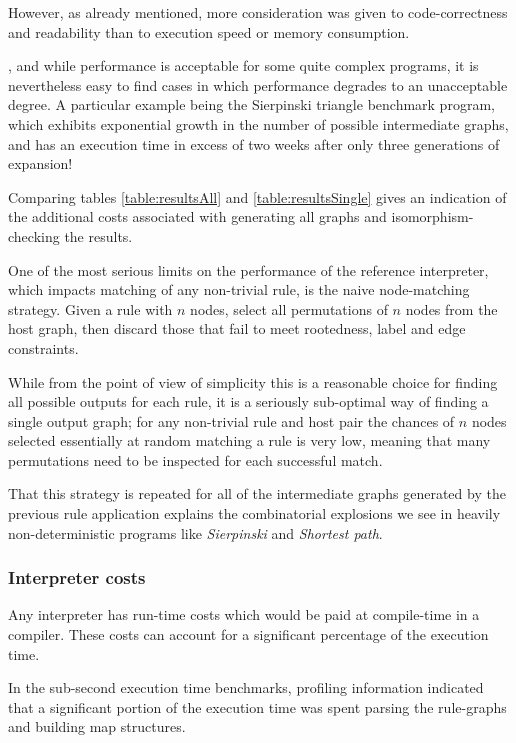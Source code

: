 However, as already mentioned, more consideration was given to code-correctness and readability than to execution speed or memory consumption.

, and while performance is acceptable for some quite complex programs, it is nevertheless easy to find cases in which performance degrades to an unacceptable degree. A particular example being the Sierpinski triangle benchmark program, which exhibits exponential growth in the number of possible intermediate graphs, and has an execution time in excess of two weeks after only three generations of expansion!

Comparing tables \ref{table:resultsAll} and \ref{table:resultsSingle} gives an indication of the additional costs associated with generating all graphs and isomorphism-checking the results.

One of the most serious limits on the performance of the reference interpreter, which impacts matching of any non-trivial rule, is the naive node-matching strategy. Given a rule with $n$ nodes, select all permutations of $n$ nodes from the host graph, then discard those that fail to meet rootedness, label and edge constraints.

While from the point of view of simplicity this is a reasonable choice for finding all possible outputs for each rule, it is a seriously sub-optimal way of finding a single output graph; for any non-trivial rule and host pair the chances of $n$ nodes selected essentially at random matching a rule is very low, meaning that many permutations need to be inspected for each successful match.

That this strategy is repeated for all of the intermediate graphs generated by the previous rule application explains the combinatorial explosions we see in heavily non-deterministic programs like \textit{Sierpinski} and \textit{Shortest path}.

\subsubsection*{Interpreter costs}

Any interpreter has run-time costs which would be paid at compile-time in a compiler. These costs can account for a significant percentage of the execution time.

In the sub-second execution time benchmarks, profiling information indicated that a significant portion of the execution time was spent parsing the rule-graphs and building map structures.




